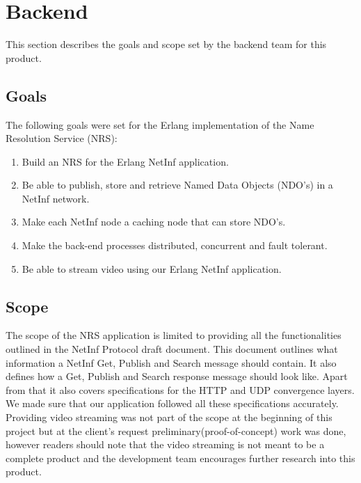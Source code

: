 \section{Backend}
This section describes the goals and scope set by the backend team for this product.

\subsection{Goals}
The following goals were set for the Erlang implementation of the Name Resolution Service (NRS):
\begin{enumerate}
 \item {Build an NRS for the Erlang NetInf application.}\\
 \item {Be able to publish, store and retrieve Named Data Objects (NDO's) in a NetInf network.}\\
 \item {Make each NetInf node a caching node that can store NDO's.}\\
 \item {Make the back-end processes distributed, concurrent and fault tolerant.}\\ 
 \item {Be able to stream video using our Erlang NetInf application.}\\
  \end{enumerate}

\subsection{Scope}
The scope of the NRS application is limited to providing all the functionalities outlined in the NetInf Protocol draft document. \cite{netinfproto} This document outlines what information a NetInf Get, Publish and Search message should contain. It also defines how a Get, Publish and Search response message should look like. Apart from that it also covers specifications for the HTTP and UDP convergence layers. We made sure that our application followed all these specifications accurately. Providing video streaming was not part of the scope at the beginning of this project but at the client's request preliminary(proof-of-concept) work was done, however readers should note that the video streaming is not meant to be a complete product and the development team encourages further research into this product.
